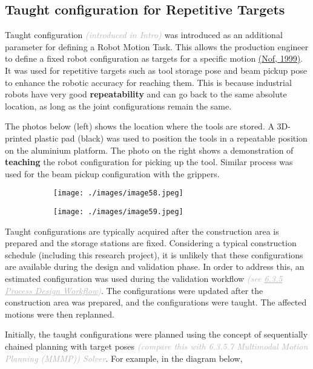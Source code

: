 \subsection{Taught configuration for Repetitive Targets}

Taught configuration \textit{\textcolor[HTML]{B7B7B7}{(introduced in Intro) }}was introduced as an additional parameter for defining a Robot Motion Task. This allows the production engineer to define a fixed robot configuration as targets for a specific motion \href{https://www.zotero.org/google-docs/?nTPVNG}{(Nof, 1999)}. It was used for repetitive targets such as tool storage pose and beam pickup pose to enhance the robotic accuracy for reaching them. This is because industrial robots have very good \textbf{repeatability }and can go back to the same absolute location, as long as the joint configurations remain the same. 

The photos below (left) shows the location where the tools are stored. A 3D-printed plastic pad (black) was used to position the tools in a repeatable position on the aluminium platform. The photo on the right shows a demonstration of \textbf{teaching }the robot configuration for picking up the tool. Similar process was used for the beam pickup configuration with the grippers.

\begin{figure}[H]
\centering
\begin{subfigure}[b]{0.45\textwidth}
\centering
\texttt{[image: ./images/image58.jpeg]}
\end{subfigure}
\hfill
\begin{subfigure}[b]{0.45\textwidth}
\centering
\texttt{[image: ./images/image59.jpeg]}
\end{subfigure}
\end{figure}


Taught configurations are typically acquired after the construction area is prepared and the storage stations are fixed. Considering a typical construction schedule (including this research project), it is unlikely that these configurations are available during the design and validation phase. In order to address this, an estimated configuration was used during the validation workflow \textit{\textcolor[HTML]{B7B7B7}{(see \uline{6.3.5 Process Design Workflow})}}. The configurations were updated after the construction area was prepared, and the configurations were taught. The affected motions were then replanned.

Initially, the taught configurations were planned using the concept of sequentially chained planning with target poses\textit{\textcolor[HTML]{B7B7B7}{ (compare this with 6.3.5.7 Multimodal Motion Planning (MMMP)) Solver}}. For example, in the diagram below,

